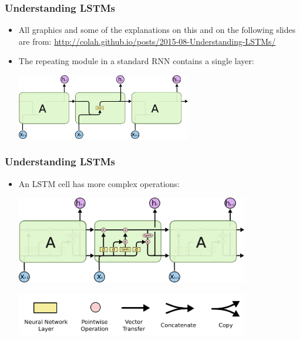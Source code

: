 \documentclass{beamer}
\begin{document}
\begin{frame}[fragile]
\frametitle{Understanding LSTMs}
  \begin{itemize}
	\item All graphics and some of the explanations on this and on the following slides are from: \url{http://colah.github.io/posts/2015-08-Understanding-LSTMs/}
	\item  The repeating module in a standard RNN contains a single layer:	
\begin{center}
	\includegraphics[width=0.6\textwidth]{05_LSTM3-SimpleRNN}
\end{center}
  \end{itemize}
\end{frame}

\begin{frame}[fragile]
\frametitle{Understanding LSTMs}
  \begin{itemize}
	\item An LSTM cell has more complex operations:
	\begin{center}
	\includegraphics[width=0.8\textwidth]{05_LSTM3-chain}
\end{center}
\begin{center}
	\includegraphics[width=0.8\textwidth]{05_LSTM2-notation}
\end{center}
  \end{itemize}
\end{frame}
\end{document}
